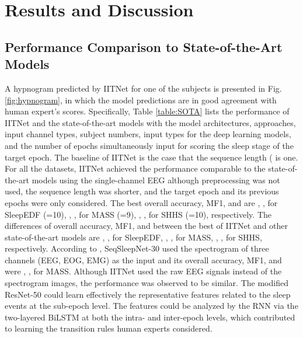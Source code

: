 \documentclass[10pt,twocolumn,twoside]{IEEEtran}
\begin{document}
	\section{Results and Discussion}
	\label{sec:resultsanddiscussion}
    \subsection{Performance Comparison to State-of-the-Art Models}
    
    A hypnogram predicted by IITNet for one of the subjects is presented in Fig. \ref{fig:hypnogram}, in which the model predictions are in good agreement with human expert's scores. Specifically, Table \ref{table:SOTA} lists the performance of IITNet and the state-of-the-art models with the model architectures, approaches, input channel types, subject numbers, input types for the deep learning models, and the number of epochs simultaneously input for scoring the sleep stage of the target epoch. The baseline of IITNet is the case that the sequence length ( is one. For all the datasets, IITNet achieved the performance comparable to the state-of-the-art models using the single-channel EEG although preprocessing was not used, the sequence length was shorter, and the target epoch and its previous epochs were only considered. The best overall accuracy, MF1, and  are , ,  for SleepEDF (=10), , ,  for MASS (=9), , ,  for SHHS (=10), respectively. The differences of overall accuracy, MF1, and  between the best of IITNet and other state-of-the-art models are , ,  for SleepEDF, , ,  for MASS, , ,  for SHHS, respectively. According to \cite{phan2019seqsleepnet}, SeqSleepNet-30 used the spectrogram of three channels (EEG, EOG, EMG) as the input and its overall accuracy, MF1, and  were , ,  for MASS. Although IITNet used the raw EEG signals instead of the spectrogram images, the performance was observed to be similar. The modified ResNet-50 could learn effectively the representative features related to the sleep events at the sub-epoch level. The features could be analyzed by the RNN via the two-layered BiLSTM at both the intra- and inter-epoch levels, which contributed to learning the transition rules human experts considered.
    
\end{document}
